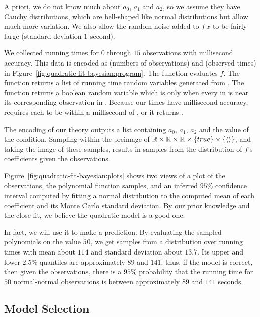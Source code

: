 A priori, we do not know much about $a_0$, $a_1$ and $a_2$, so we assume they have Cauchy distributions, which are bell-shaped like normal distributions but allow much more variation.
We also allow the random noise added to $f~x$ to be fairly large (standard deviation $1$ second).

We collected running times for $0$ through $15$ observations with millisecond accuracy.
This data is encoded as  (numbers of observations) and  (observed times) in Figure~\ref{fig:quadratic-fit-bayesian:program}.
The function  evaluates $f$.
The  function returns a list of running time random variables generated from .
The  function returns a boolean random variable which is  only when every  in  is near its corresponding observation  in .
Because our times have millisecond accuracy,  requires each  to be within a millisecond of , or it returns .

The encoding of our theory outputs a list containing $a_0$, $a_1$, $a_2$ and the value of the condition.
Sampling within the preimage of $\mathbb{R} \times \mathbb{R} \times \mathbb{R} \times \{{true}\} \times \{{\langle{}\rangle}\}$, and taking the image of these samples, results in samples from the distribution of $f$'s coefficients given the observations.

Figure~\ref{fig:quadratic-fit-bayesian:plots} shows two views of a plot of the observations, the polynomial function samples, and an inferred $95\%$ confidence interval computed by fitting a normal distribution to the computed mean of each coefficient and its Monte Carlo standard deviation.
By our prior knowledge and the close fit, we believe the quadratic model is a good one.

In fact, we will use it to make a prediction.
By evaluating the sampled polynomials on the value $50$, we get samples from a distribution over running times with mean about $114$ and standard deviation about $13.7$.
Its upper and lower $2.5\%$ quantiles are approximately $89$ and $141$; thus, if the model is correct, then given the observations, there is a $95\%$ probability that the running time for $50$ normal-normal observations is between approximately $89$ and $141$ seconds.

\subsection{Model Selection}

